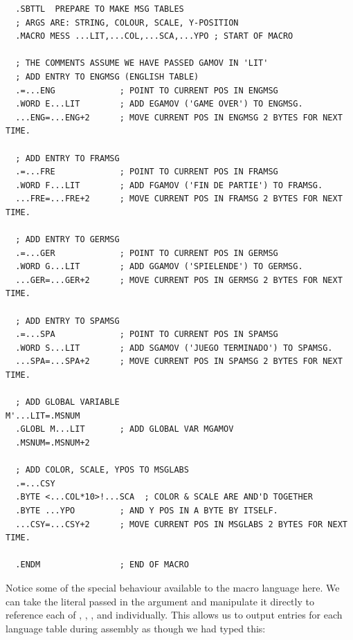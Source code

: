 \begin{lstlisting}
  .SBTTL  PREPARE TO MAKE MSG TABLES
  ; ARGS ARE: STRING, COLOUR, SCALE, Y-POSITION
  .MACRO MESS ...LIT,...COL,...SCA,...YPO ; START OF MACRO

  ; THE COMMENTS ASSUME WE HAVE PASSED GAMOV IN 'LIT'
  ; ADD ENTRY TO ENGMSG (ENGLISH TABLE)
  .=...ENG             ; POINT TO CURRENT POS IN ENGMSG
  .WORD E...LIT        ; ADD EGAMOV ('GAME OVER') TO ENGMSG.
  ...ENG=...ENG+2      ; MOVE CURRENT POS IN ENGMSG 2 BYTES FOR NEXT TIME.
    
  ; ADD ENTRY TO FRAMSG
  .=...FRE             ; POINT TO CURRENT POS IN FRAMSG
  .WORD F...LIT        ; ADD FGAMOV ('FIN DE PARTIE') TO FRAMSG.
  ...FRE=...FRE+2      ; MOVE CURRENT POS IN FRAMSG 2 BYTES FOR NEXT TIME.
    
  ; ADD ENTRY TO GERMSG
  .=...GER             ; POINT TO CURRENT POS IN GERMSG
  .WORD G...LIT        ; ADD GGAMOV ('SPIELENDE') TO GERMSG.
  ...GER=...GER+2      ; MOVE CURRENT POS IN GERMSG 2 BYTES FOR NEXT TIME.
    
  ; ADD ENTRY TO SPAMSG
  .=...SPA             ; POINT TO CURRENT POS IN SPAMSG
  .WORD S...LIT        ; ADD SGAMOV ('JUEGO TERMINADO') TO SPAMSG.
  ...SPA=...SPA+2      ; MOVE CURRENT POS IN SPAMSG 2 BYTES FOR NEXT TIME.
    
  ; ADD GLOBAL VARIABLE
M'...LIT=.MSNUM
  .GLOBL M...LIT       ; ADD GLOBAL VAR MGAMOV
  .MSNUM=.MSNUM+2
    
  ; ADD COLOR, SCALE, YPOS TO MSGLABS
  .=...CSY
  .BYTE <...COL*10>!...SCA  ; COLOR & SCALE ARE AND'D TOGETHER
  .BYTE ...YPO         ; AND Y POS IN A BYTE BY ITSELF.
  ...CSY=...CSY+2      ; MOVE CURRENT POS IN MSGLABS 2 BYTES FOR NEXT TIME.

  .ENDM                ; END OF MACRO
\end{lstlisting}

Notice some of the special behaviour available to the macro language here. We can take the literal
 passed in the argument  and manipulate it directly to reference each of
, , , and 
individually. This allows us to output entries for each language table during assembly as though we had typed this:

